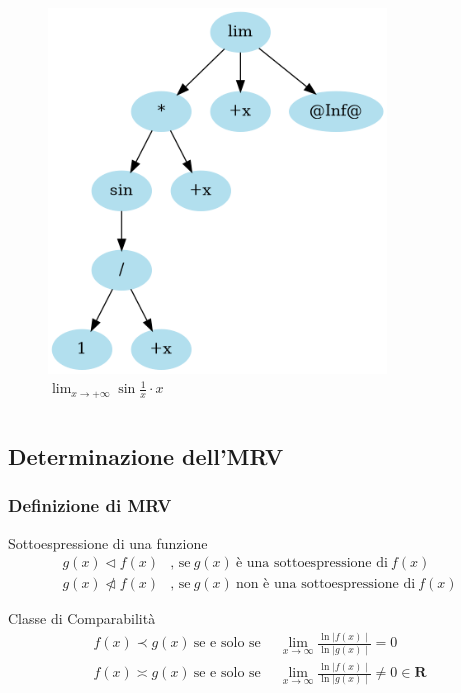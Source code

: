 \documentclass[aspectratio=149]{beamer}
\begin{document}
\begin{frame}
\begin{columns}
\begin{column}{0.45\textwidth}
\begin{figure}
					\includegraphics[width=0.8\textwidth]{pres_img/prima_semplif.png}
					\caption{\(\lim_{x \to +\infty}{\sin{\frac{1}{x}} \cdot x}\)}
				\end{figure}
			\end{column}
		\end{columns}
	\end{frame}

	\subsection{Determinazione dell'MRV}
	
	\begin{frame}
		\frametitle{Definizione di MRV}
		\begin{block}{Sottoespressione di una funzione}
			\[
			\begin{aligned}
				g(x) \triangleleft f(x)&\text{, se} \: g(x) \: \text{è una sottoespressione di} \: f(x) \\
				g(x) \ntriangleleft f(x)&\text{, se} \: g(x) \: \text{non è una sottoespressione di} \: f(x)
			\end{aligned}
			\]
		\end{block}
		\begin{block}{Classe di Comparabilità}
			\[
			\begin{aligned}
				f(x) \prec g(x) \: \text{se e solo se} \enspace &\lim_{x \to \infty}{\frac{\ln{\mid f(x)\mid}}{\ln{\mid g(x)\mid}}} = 0 \\ 
				f(x) \asymp g(x) \: \text{se e solo se} \enspace &\lim_{x \to \infty}{\frac{\ln{\mid f(x)\mid}}{\ln{\mid g(x)\mid}}} \neq 0 \in \mathbf{R}
			\end{aligned} \tag{2} \label{defn:comparability}
			\] 
		\end{block}
	\end{frame}
\end{document}

